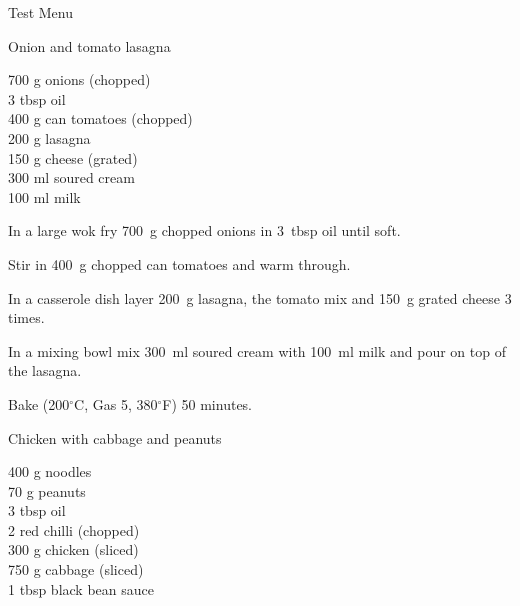 \begin{menu}{Test Menu}
\begin{recipe}{2}{Onion and tomato lasagna}
		\begin{ingredients}
		700 g onions (chopped) \\
	3 tbsp oil  \\
	400 g can tomatoes (chopped) \\
	200 g lasagna  \\
	150 g cheese (grated) \\
	300 ml soured cream  \\
	100 ml milk  \\
	
		\end{ingredients}
	
	
    \begin{instructions}
    \item 
        In a large wok fry
        700~g chopped onions
        in
        3~tbsp  oil
        until soft.
      \item 
        Stir in 400~g chopped can tomatoes
        and warm through.
      \item 
        In a casserole dish layer
        200~g  lasagna,
        the tomato mix and
        150~g grated cheese
        3 times.
      \item 
        In a mixing bowl mix
        300~ml  soured cream
        with
        100~ml  milk
        and pour on top of the lasagna.
      \item 
        Bake 
      (200$^{\circ}$C, Gas 5, 380$^{\circ}$F)
     50 minutes.
      
    \end{instructions}
    \end{recipe}%
  
    \begin{recipe}{2}{Chicken with cabbage and peanuts}%
    
		\begin{ingredients}
		400 g noodles  \\
	70 g peanuts  \\
	3 tbsp oil  \\
	2  red chilli (chopped) \\
	300 g chicken (sliced) \\
	750 g cabbage (sliced) \\
	1 tbsp black bean sauce  \\
	
		\end{ingredients}
	

\end{recipe}
\end{menu}
